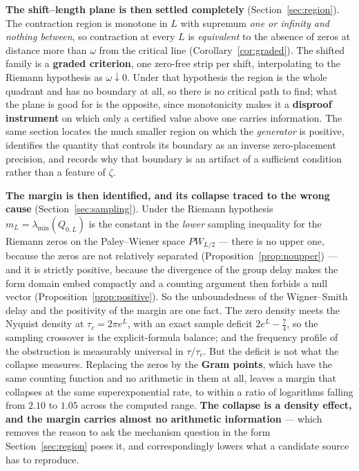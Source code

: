 \textbf{The shift--length plane is then settled completely}
(Section~\ref{sec:region}). The contraction region is monotone in $L$ with
supremum \emph{one or infinity and nothing between}, so contraction at every $L$
is \emph{equivalent} to the absence of zeros at distance more than $\omega$ from
the critical line (Corollary~\ref{cor:graded}). The shifted family is a
\textbf{graded criterion}, one zero-free strip per shift, interpolating to the
Riemann hypothesis as $\omega\downarrow0$. Under that hypothesis the region is the
whole quadrant and has no boundary at all, so there is no critical path to find;
what the plane is good for is the opposite, since monotonicity makes it a
\textbf{disproof instrument} on which only a certified value above one carries
information. The same section locates the much smaller region on which the
\emph{generator} is positive, identifies the quantity that controls its boundary
as an inverse zero-placement precision, and records why that boundary is an
artifact of a sufficient condition rather than a feature of $\zeta$.

\textbf{The margin is then identified, and its collapse traced to the wrong
cause} (Section~\ref{sec:sampling}). Under the Riemann hypothesis
$m_L=\lambda_{\min}(Q_{0,L})$ is the constant in the \emph{lower} sampling
inequality for the Riemann zeros on the Paley--Wiener space $PW_{L/2}$ --- there
is no upper one, because the zeros are not relatively separated
(Proposition~\ref{prop:noupper}) --- and it is strictly positive, because the
divergence of the group delay makes the form domain embed compactly and a counting
argument then forbids a null vector (Proposition~\ref{prop:positive}). So the
unboundedness of the Wigner--Smith delay and the positivity of the margin are one
fact. The zero density meets the Nyquist density at $\tau_c=2\pi e^L$, with an
exact sample deficit $2e^L-\frac74$, so the sampling crossover is the
explicit-formula balance; and the frequency profile of the obstruction is
measurably universal in $\tau/\tau_c$. But the deficit is not what the collapse
measures. Replacing the zeros by the \textbf{Gram points}, which have the same
counting function and no arithmetic in them at all, leaves a margin that collapses
at the same superexponential rate, to within a ratio of logarithms falling from
$2.10$ to $1.05$ across the computed range. \textbf{The collapse is a density
effect, and the margin carries almost no arithmetic information} --- which removes
the reason to ask the mechanism question in the form Section~\ref{sec:region}
poses it, and correspondingly lowers what a candidate source has to reproduce.

